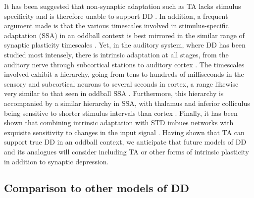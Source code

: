 \documentclass[9pt,lineno,onehalfspacing]{elife}
\begin{document}
It has been suggested that non-synaptic adaptation such as TA lacks stimulus specificity and is therefore unable to support DD \citep{Duque2015-eu, Yarden2017-eh}. In addition, a frequent argument made is that the various timescales involved in stimulus-specific adaptation (SSA) in an oddball context \citep{Ulanovsky2004-nf} is best mirrored in the similar range of synaptic plasticity timescales \citep{Tsodyks1997-qt, Varela1997-nr}. Yet, in the auditory system, where DD has been studied most intensely, there is intrinsic adaptation at all stages, from the auditory nerve \citep{Yates1983-uu, Westerman1984-ge} through subcortical stations \citep{Ingham2004-wc} to auditory cortex \citep{Abolafia2011-ig}. The timescales involved exhibit a hierarchy, going from tens to hundreds of milliseconds in the sensory and subcortical neurons to several seconds in cortex, a range likewise very similar to that seen in oddball SSA \citep{Ulanovsky2004-nf}. Furthermore, this hierarchy is accompanied by a similar hierarchy in SSA, with thalamus and inferior colliculus being sensitive to shorter stimulus intervals than cortex \citep{Perez-Gonzalez2014-pm}. Finally, it has been shown that combining intrinsic adaptation with STD imbues networks with exquisite sensitivity to changes in the input signal \citep{Puccini2006-tm}. Having shown that TA can support true DD in an oddball context, we anticipate that future models of DD and its analogues will consider including TA or other forms of intrinsic plasticity in addition to synaptic depression.

\subsection{Comparison to other models of DD}
\end{document}
